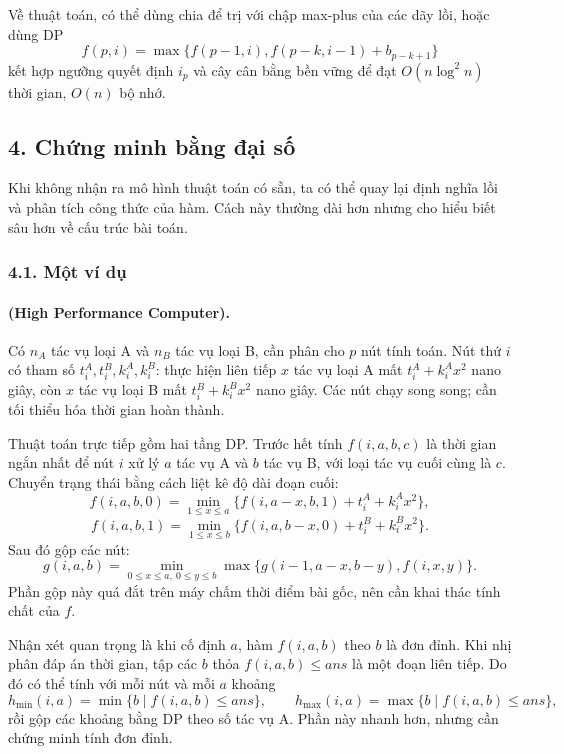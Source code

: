 \documentclass[11pt]{article}
\begin{document}
Về thuật toán, có thể dùng chia để trị với chập max-plus của các dãy lồi, hoặc
dùng DP
\[
  f(p,i)=\max\{f(p-1,i), f(p-k,i-1)+b_{p-k+1}\}
\]
kết hợp ngưỡng quyết định $i_p$ và cây cân bằng bền vững để đạt
$O(n\log^2 n)$ thời gian, $O(n)$ bộ nhớ.

\subsection*{4. Chứng minh bằng đại số}

Khi không nhận ra mô hình thuật toán có sẵn, ta có thể quay lại định nghĩa
lồi và phân tích công thức của hàm. Cách này thường dài hơn nhưng cho hiểu
biết sâu hơn về cấu trúc bài toán.

\subsubsection*{4.1. Một ví dụ}

\paragraph{ (High Performance Computer).}
Có $n_A$ tác vụ loại A và $n_B$ tác vụ loại B, cần phân cho $p$ nút tính toán.
Nút thứ $i$ có tham số $t_i^A,t_i^B,k_i^A,k_i^B$: thực hiện liên tiếp $x$ tác
vụ loại A mất $t_i^A+k_i^Ax^2$ nano giây, còn $x$ tác vụ loại B mất
$t_i^B+k_i^Bx^2$ nano giây. Các nút chạy song song; cần tối thiểu hóa thời gian
hoàn thành.

Thuật toán trực tiếp gồm hai tầng DP. Trước hết tính $f(i,a,b,c)$ là thời gian
ngắn nhất để nút $i$ xử lý $a$ tác vụ A và $b$ tác vụ B, với loại tác vụ cuối
cùng là $c$. Chuyển trạng thái bằng cách liệt kê độ dài đoạn cuối:
\[
  f(i,a,b,0)=\min_{1\le x\le a}
  \{f(i,a-x,b,1)+t_i^A+k_i^Ax^2\},
\]
\[
  f(i,a,b,1)=\min_{1\le x\le b}
  \{f(i,a,b-x,0)+t_i^B+k_i^Bx^2\}.
\]
Sau đó gộp các nút:
\[
  g(i,a,b)=
  \min_{0\le x\le a,\ 0\le y\le b}
  \max\{g(i-1,a-x,b-y), f(i,x,y)\}.
\]
Phần gộp này quá đắt trên máy chấm thời điểm bài gốc, nên cần khai thác tính
chất của $f$.

Nhận xét quan trọng là khi cố định $a$, hàm $f(i,a,b)$ theo $b$ là đơn đỉnh.
Khi nhị phân đáp án thời gian, tập các $b$ thỏa $f(i,a,b)\le ans$ là một đoạn
liên tiếp. Do đó có thể tính với mỗi nút và mỗi $a$ khoảng
\[
  h_{\min}(i,a)=\min\{b\mid f(i,a,b)\le ans\},\qquad
  h_{\max}(i,a)=\max\{b\mid f(i,a,b)\le ans\},
\]
rồi gộp các khoảng bằng DP theo số tác vụ A. Phần này nhanh hơn, nhưng cần
chứng minh tính đơn đỉnh.
\end{document}
